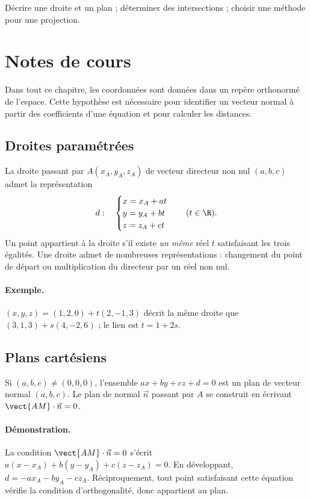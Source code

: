 \label{ch:12}


\begin{keypoint}[Objectifs]Décrire une droite et un plan ; déterminer des intersections ; choisir une méthode pour une projection.\end{keypoint}

\section{Notes de cours}
Dans tout ce chapitre, les coordonnées sont données dans un repère orthonormé de l'espace. Cette hypothèse est nécessaire pour identifier un vecteur normal à partir des coefficients d'une équation et pour calculer les distances.
\subsection{Droites paramétrées}
La droite passant par $A(x_A,y_A,z_A)$ de vecteur directeur non nul $(a,b,c)$ admet la représentation
\[d:\quad\begin{cases}x=x_A+at\\y=y_A+bt\\z=z_A+ct\end{cases}\quad(t\in\R).\]
Un point appartient à la droite s'il existe \emph{un même} réel $t$ satisfaisant les trois égalités. Une droite admet de nombreuses représentations : changement du point de départ ou multiplication du directeur par un réel non nul.
\paragraph{Exemple.} $(x,y,z)=(1,2,0)+t(2,-1,3)$ décrit la même droite que $(3,1,3)+s(4,-2,6)$ ; le lien est $t=1+2s$.
\subsection{Plans cartésiens}
\begin{keypoint}
Si $(a,b,c)\ne(0,0,0)$, l'ensemble $ax+by+cz+d=0$ est un plan de vecteur normal $(a,b,c)$. Le plan de normal $\vec n$ passant par $A$ se construit en écrivant $\vect{AM}\cdot\vec n=0$.
\end{keypoint}
\paragraph{Démonstration.} La condition $\vect{AM}\cdot\vec n=0$ s'écrit $a(x-x_A)+b(y-y_A)+c(z-z_A)=0$. En développant, $d=-ax_A-by_A-cz_A$. Réciproquement, tout point satisfaisant cette équation vérifie la condition d'orthogonalité, donc appartient au plan.
